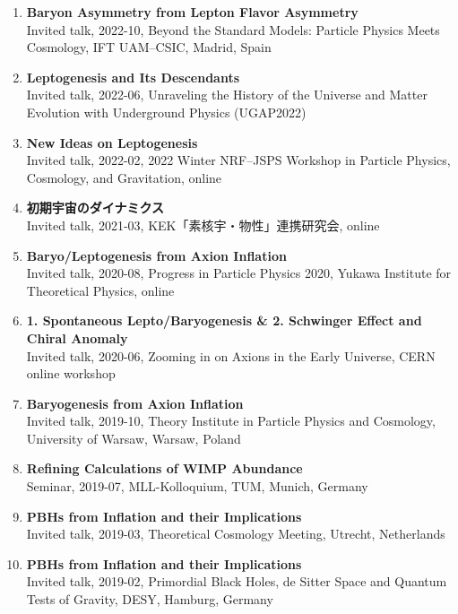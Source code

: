 \begin{enumerate}
\item \textbf{Baryon Asymmetry from Lepton Flavor Asymmetry}\\ Invited talk, 2022-10, Beyond the Standard Models: Particle Physics Meets Cosmology, IFT UAM--CSIC, Madrid, Spain

\item \textbf{Leptogenesis and Its Descendants}\\ Invited talk, 2022-06, Unraveling the History of the Universe and Matter Evolution with Underground Physics (UGAP2022)

\item \textbf{New Ideas on Leptogenesis}\\ Invited talk, 2022-02, 2022 Winter NRF--JSPS Workshop in Particle Physics, Cosmology, and Gravitation, online

\item \textbf{初期宇宙のダイナミクス}\\ Invited talk, 2021-03, KEK「素核宇・物性」連携研究会, online

\item \textbf{Baryo/Leptogenesis from Axion Inflation}\\ Invited talk, 2020-08, Progress in Particle Physics 2020, Yukawa Institute for Theoretical Physics, online

\item \textbf{1. Spontaneous Lepto/Baryogenesis \& 2. Schwinger Effect and Chiral Anomaly}\\ Invited talk, 2020-06, Zooming in on Axions in the Early Universe, CERN online workshop

\item \textbf{Baryogenesis from Axion Inflation}\\ Invited talk, 2019-10, Theory Institute in Particle Physics and Cosmology, University of Warsaw, Warsaw, Poland

\item \textbf{Refining Calculations of WIMP Abundance}\\ Seminar, 2019-07, MLL-Kolloquium, TUM, Munich, Germany

\item \textbf{PBHs from Inflation and their Implications}\\ Invited talk, 2019-03, Theoretical Cosmology Meeting, Utrecht, Netherlands

\item \textbf{PBHs from Inflation and their Implications}\\ Invited talk, 2019-02, Primordial Black Holes, de Sitter Space and Quantum Tests of Gravity, DESY, Hamburg, Germany


\end{enumerate}
